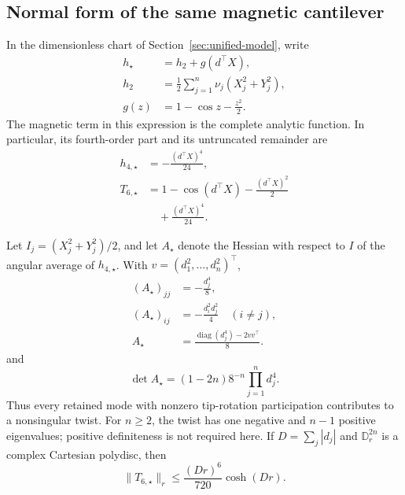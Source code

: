 \subsection{Normal form of the same magnetic cantilever}
\label{sec:unified-normal-form}

In the dimensionless chart of Section~\ref{sec:unified-model}, write
\begin{equation}
 \begin{aligned}
 h_\star&=h_2+g(d^\top X),\\
 h_2&=\frac12\sum_{j=1}^n\nu_j(X_j^2+Y_j^2),\\
 g(z)&=1-\cos z-\frac{z^2}{2}.
 \end{aligned}
 \label{eq:beam-exact-h}
\end{equation}
The magnetic term in this expression is the complete analytic function.
In particular, its fourth-order part and its untruncated remainder are
\[
 \begin{aligned}
 h_{4,\star}&=-\frac{(d^\top X)^4}{24},\\
 T_{6,\star}&=1-\cos(d^\top X)-\frac{(d^\top X)^2}{2}\\
 &\quad+\frac{(d^\top X)^4}{24}.
 \end{aligned}
\]

\begin{proposition}
\label{prop:magnetic-twist}
Let $I_j=(X_j^2+Y_j^2)/2$, and let $A_\star$ denote the Hessian with
respect to $I$ of the angular average of $h_{4,\star}$.
With $v=(d_1^2,\ldots,d_n^2)^\top$,
\begin{equation}
 \begin{aligned}
 (A_\star)_{jj}&=-\frac{d_j^4}{8},\\
 (A_\star)_{ij}&=-\frac{d_i^2d_j^2}{4}\quad(i\ne j),\\
 A_\star&=\frac{\operatorname{diag}(d_j^4)-2vv^\top}{8}.
 \end{aligned}
 \label{eq:beam-twist}
\end{equation}
and
\begin{equation}
 \det A_\star=(1-2n)8^{-n}\prod_{j=1}^n d_j^4.
 \label{eq:beam-twist-det}
\end{equation}
Thus every retained mode with nonzero tip-rotation participation contributes
to a nonsingular twist. For $n\geq2$, the twist has one negative and $n-1$
positive eigenvalues; positive definiteness is not required here.
If $D=\sum_j|d_j|$ and $\mathbb D_r^{2n}$ is a complex Cartesian polydisc,
then
\begin{equation}
 \|T_{6,\star}\|_r\leq\frac{(Dr)^6}{720}\cosh(Dr).
 \label{eq:beam-cos-tail}
\end{equation}
\end{proposition}

